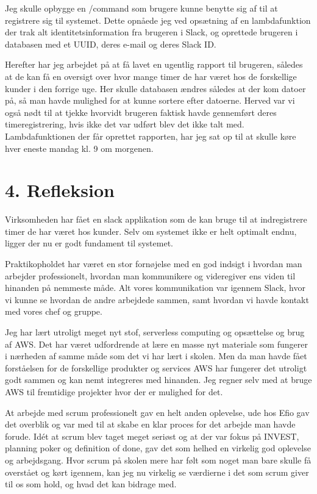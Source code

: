 \documentclass[11pt]{report}
\begin{document}
Jeg skulle opbygge en /command som brugere kunne benytte sig af til at registrere sig til systemet. 
Dette opnåede jeg ved opsætning af en lambdafunktion der trak alt identitetsinformation fra brugeren i Slack, 
og oprettede brugeren i databasen med et UUID, deres e-mail og deres Slack ID.

Herefter har jeg arbejdet på at få lavet en ugentlig rapport til brugeren, 
således at de kan få en oversigt over hvor mange timer de har været hos de forskellige kunder i den forrige uge. 
Her skulle databasen ændres således at der kom datoer på, så man havde mulighed for at kunne sortere efter datoerne. 
Herved var vi også nødt til at tjekke hvorvidt brugeren faktisk havde gennemført deres timeregistrering, hvis ikke det var 
udført blev det ikke talt med. Lambdafunktionen der får oprettet rapporten, 
har jeg sat op til at skulle køre hver eneste mandag kl. 9 om morgenen.

\chapter*{4. Refleksion}
Virksomheden har fået en slack applikation som de kan bruge til at indregistrere timer de har været hos kunder. 
Selv om systemet ikke er helt optimalt endnu, ligger der nu er godt fundament til systemet.

Praktikopholdet har været en stor fornøjelse med en god indsigt i hvordan man arbejder professionelt, 
hvordan man kommunikere og videregiver ens viden til hinanden på nemmeste måde. Alt vores kommunikation var igennem Slack, 
hvor vi kunne se hvordan de andre arbejdede sammen, samt hvordan vi havde kontakt med vores chef og gruppe. 

Jeg har lært utroligt meget nyt stof, serverless computing og opsættelse og brug af AWS. 
Det har været udfordrende at lære en masse nyt materiale som fungerer i nærheden af samme måde som det vi har lært i skolen. 
Men da man havde fået forståelsen for de forskellige produkter og services AWS har fungerer det utroligt godt sammen og 
kan nemt integreres med hinanden. Jeg regner selv med at bruge AWS til fremtidige projekter hvor der er mulighed for det.

At arbejde med scrum professionelt gav en helt anden oplevelse, ude hos Efio gav det overblik og var med til at skabe 
en klar proces for det arbejde man havde forude. Idét at scrum blev taget meget seriøst og at der var fokus på INVEST, 
planning poker og definition of done, gav det som helhed en virkelig god oplevelse og arbejdsgang. 
Hvor scrum på skolen mere har følt som noget man bare skulle få overstået og kørt igennem, 
kan jeg nu virkelig se værdierne i det som scrum giver til os som hold, og hvad det kan bidrage med. 
\end{document}
